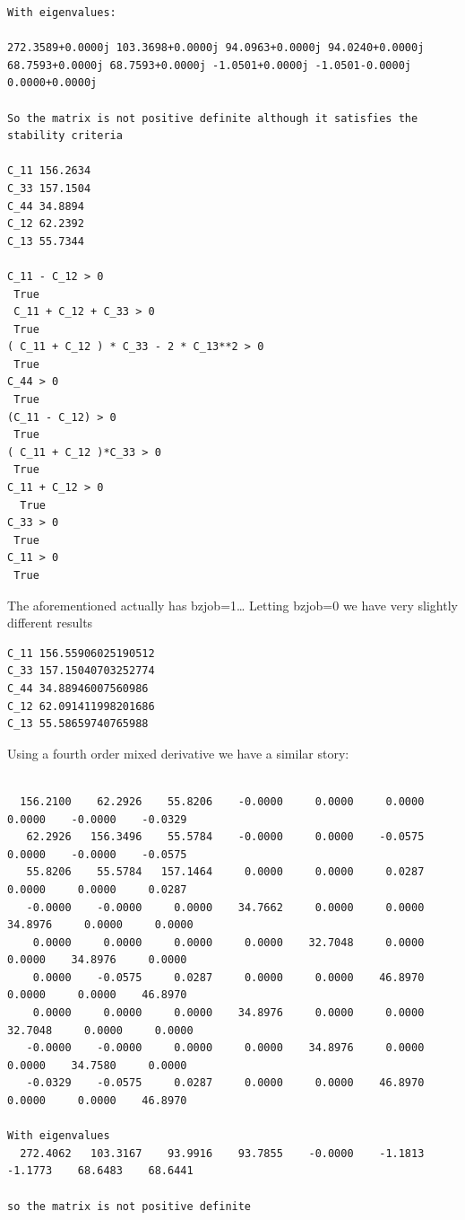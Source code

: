 \documentclass[11pt]{article}
\begin{document}
\begin{enumerate}
\begin{enumerate}
\begin{enumerate}
\begin{verbatim}
With eigenvalues:

272.3589+0.0000j 103.3698+0.0000j 94.0963+0.0000j 94.0240+0.0000j 68.7593+0.0000j 68.7593+0.0000j -1.0501+0.0000j -1.0501-0.0000j 0.0000+0.0000j

So the matrix is not positive definite although it satisfies the stability criteria

C_11 156.2634
C_33 157.1504
C_44 34.8894
C_12 62.2392
C_13 55.7344

C_11 - C_12 > 0 
 True
 C_11 + C_12 + C_33 > 0 
 True
( C_11 + C_12 ) * C_33 - 2 * C_13**2 > 0 
 True
C_44 > 0 
 True
(C_11 - C_12) > 0
 True
( C_11 + C_12 )*C_33 > 0 
 True
C_11 + C_12 > 0
  True
C_33 > 0
 True
C_11 > 0
 True

\end{verbatim}

The aforementioned actually has bzjob=1\ldots{}
Letting bzjob=0 we have very slightly different results 
\begin{verbatim}
C_11 156.55906025190512
C_33 157.15040703252774
C_44 34.88946007560986
C_12 62.091411998201686
C_13 55.58659740765988
\end{verbatim}


Using a fourth order mixed derivative we have a similar story:

\begin{verbatim}

  156.2100    62.2926    55.8206    -0.0000     0.0000     0.0000     0.0000    -0.0000    -0.0329
   62.2926   156.3496    55.5784    -0.0000     0.0000    -0.0575     0.0000    -0.0000    -0.0575
   55.8206    55.5784   157.1464     0.0000     0.0000     0.0287     0.0000     0.0000     0.0287
   -0.0000    -0.0000     0.0000    34.7662     0.0000     0.0000    34.8976     0.0000     0.0000
    0.0000     0.0000     0.0000     0.0000    32.7048     0.0000     0.0000    34.8976     0.0000
    0.0000    -0.0575     0.0287     0.0000     0.0000    46.8970     0.0000     0.0000    46.8970
    0.0000     0.0000     0.0000    34.8976     0.0000     0.0000    32.7048     0.0000     0.0000
   -0.0000    -0.0000     0.0000     0.0000    34.8976     0.0000     0.0000    34.7580     0.0000
   -0.0329    -0.0575     0.0287     0.0000     0.0000    46.8970     0.0000     0.0000    46.8970

With eigenvalues
  272.4062   103.3167    93.9916    93.7855    -0.0000    -1.1813    -1.1773    68.6483    68.6441

so the matrix is not positive definite


\end{verbatim}
\end{enumerate}
\end{enumerate}
\end{enumerate}
\end{document}
